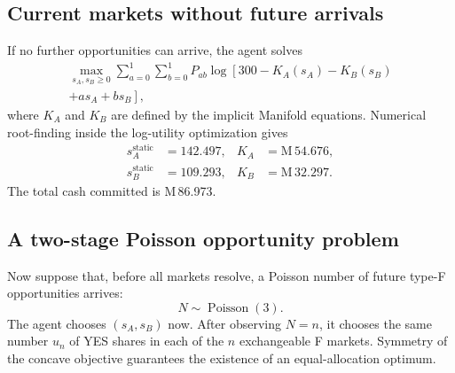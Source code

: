 \documentclass[journal, a4paper]{IEEEtran}
\begin{document}
\subsection{Current markets without future arrivals}
If no further opportunities can arrive, the agent solves
\begin{align}
\max_{s_A,s_B\geq0}
\sum_{a=0}^{1}\sum_{b=0}^{1}
P_{ab}
\log\left[
300-K_A(s_A)-K_B(s_B) \right.\nonumber \\ \left.  +a s_A+b s_B
\right],
\label{eq:example-static}
\end{align}
where $K_A$ and $K_B$ are defined by the implicit Manifold equations. Numerical root-finding inside the log-utility optimization gives
\begin{align}
 s_A^{\mathrm{static}}&=142.497, & K_A&=\text{M}\,54.676,\\
 s_B^{\mathrm{static}}&=109.293, & K_B&=\text{M}\,32.297.
\end{align}
The total cash committed is M\,86.973.

\subsection{A two-stage Poisson opportunity problem}
Now suppose that, before all markets resolve, a Poisson number of future type-F opportunities arrives:
\begin{equation}
N\sim\operatorname{Poisson}(3).
\label{eq:example-poisson}
\end{equation}
The agent chooses $(s_A,s_B)$ now. After observing $N=n$, it chooses the same number $u_n$ of YES shares in each of the $n$ exchangeable F markets. Symmetry of the concave objective guarantees the existence of an equal-allocation optimum.
\end{document}
